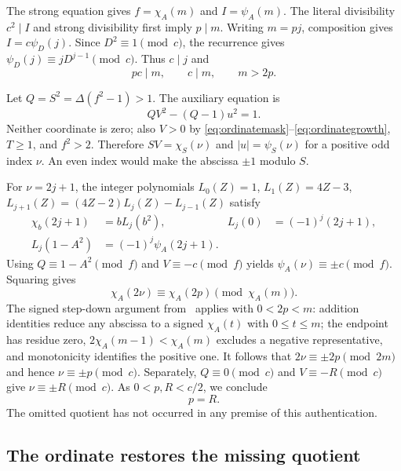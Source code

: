 The strong equation gives $f=\chi_A(m)$ and $I=\psi_A(m)$.
The literal divisibility $c^2\mid I$ and strong divisibility first imply
$p\mid m$. Writing $m=pj$, composition gives
$I=c\psi_D(j)$. Since $D^2\equiv1\pmod c$, the recurrence gives
$\psi_D(j)\equiv jD^{j-1}\pmod c$. Thus $c\mid j$ and
\begin{equation}\label{eq:ordinatestrongindex}
 pc\mid m,\qquad c\mid m,\qquad m>2p.
\end{equation}

Let $Q=S^2=\Delta(f^2-1)>1$. The auxiliary equation is
\[
 QV^2-(Q-1)u^2=1.
\]
Neither coordinate is zero; also $V>0$ by
\eqref{eq:ordinatemask}--\eqref{eq:ordinategrowth}, $T\ge1$, and $f^2>2$.
Therefore $SV=\chi_S(\nu)$ and $|u|=\psi_S(\nu)$ for a positive odd
index $\nu$. An even index would make the abscissa $\pm1$ modulo $S$.

For $\nu=2j+1$, the integer polynomials
$L_0(Z)=1$, $L_1(Z)=4Z-3$,
$L_{j+1}(Z)=(4Z-2)L_j(Z)-L_{j-1}(Z)$ satisfy
\begin{align*}
 \chi_b(2j+1)&=bL_j(b^2),&L_j(0)&=(-1)^j(2j+1),\\
 L_j(1-A^2)&=(-1)^j\psi_A(2j+1).
\end{align*}
Using $Q\equiv1-A^2\pmod f$ and $V\equiv-c\pmod f$ yields
$\psi_A(\nu)\equiv\pm c\pmod f$. Squaring gives
\[
 \chi_A(2\nu)\equiv\chi_A(2p)\pmod{\chi_A(m)}.
\]
The signed step-down argument from~\cite{proveit170} applies with
$0<2p<m$: addition identities reduce any abscissa to a signed
$\chi_A(t)$ with $0\le t\le m$; the endpoint has residue zero,
$2\chi_A(m-1)<\chi_A(m)$ excludes a negative representative, and
monotonicity identifies the positive one. It follows that
$2\nu\equiv\pm2p\pmod{2m}$ and hence $\nu\equiv\pm p\pmod c$.
Separately, $Q\equiv0\pmod c$ and $V\equiv-R\pmod c$ give
$\nu\equiv\pm R\pmod c$. As $0<p,R<c/2$, we conclude
\begin{equation}\label{eq:ordinatepR}
 p=R.
\end{equation}
The omitted quotient has not occurred in any premise of this authentication.

\subsection{The ordinate restores the missing quotient}

